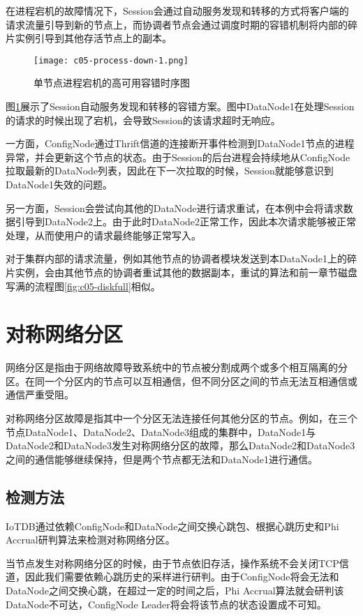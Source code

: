 在进程宕机的故障情况下，Session会通过自动服务发现和转移的方式将客户端的请求流量引导到新的节点上，而协调者节点会通过调度时期的容错机制将内部的碎片实例引导到其他存活节点上的副本。

\begin{figure}
    \centering
    \texttt{[image: c05-process-down-1.png]}
    \caption{单节点进程宕机的高可用容错时序图}
    \label{fig:c05-process-down-1}
\end{figure}

图\ref{fig:c05-process-down-1}展示了Session自动服务发现和转移的容错方案。图中DataNode1在处理Session的请求的时候出现了宕机，会导致Session的该请求超时无响应。

一方面，ConfigNode通过Thrift信道的连接断开事件检测到DataNode1节点的进程异常，并会更新这个节点的状态。由于Session的后台进程会持续地从ConfigNode拉取最新的DataNode列表，因此在下一次拉取的时候，Session就能够意识到DataNode1失效的问题。

另一方面，Session会尝试向其他的DataNode进行请求重试，在本例中会将请求数据引导到DataNode2上。由于此时DataNode2正常工作，因此本次请求能够被正常处理，从而使用户的请求最终能够正常写入。


对于集群内部的请求流量，例如其他节点的协调者模块发送到本DataNode1上的碎片实例，会由其他节点的协调者重试其他的数据副本，重试的算法和前一章节磁盘写满的流程图\ref{fig:c05-diskfull}相似。

\section{对称网络分区}

网络分区是指由于网络故障导致系统中的节点被分割成两个或多个相互隔离的分区。在同一个分区内的节点可以互相通信，但不同分区之间的节点无法互相通信或通信严重受阻。

对称网络分区故障是指其中一个分区无法连接任何其他分区的节点。例如，在三个节点DataNode1、DataNode2、DataNode3组成的集群中，DataNode1与DataNode2和DataNode3发生对称网络分区的故障，那么DataNode2和DataNode3之间的通信能够继续保持，但是两个节点都无法和DataNode1进行通信。

\subsection{检测方法}

IoTDB通过依赖ConfigNode和DataNode之间交换心跳包、根据心跳历史和Phi Accrual研判算法来检测对称网络分区。

当节点发生对称网络分区的时候，由于节点依旧存活，操作系统不会关闭TCP信道，因此我们需要依赖心跳历史的采样进行研判。由于ConfigNode将会无法和DataNode之间交换心跳，在超过一定的时间之后，Phi Accrual算法就会研判该DataNode不可达，ConfigNode Leader将会将该节点的状态设置成不可知。


